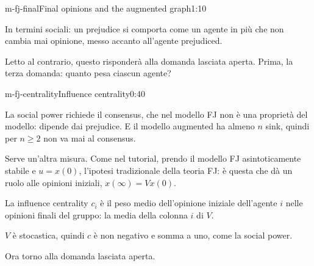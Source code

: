 \begin{slide}{m-fj-final}{Final opinions and the augmented graph}{1:10 {\color{red}}}
\begin{discorso}
    \item In termini sociali: un prejudice si comporta come un agente in più che non cambia mai opinione, messo accanto all'agente prejudiced.
    \item {\color{red} } {\color{blue}Letto} al contrario, {\color{red}} {\color{blue}questo risponderà} alla domanda lasciata aperta. {\color{blue}Prima, la terza domanda: quanto pesa ciascun agente?}
  \end{discorso}
\end{slide}

\begin{slide}{m-fj-centrality}{Influence centrality}{0:40}
  \begin{discorso}
    \item La social power richiede il consensus, che nel modello FJ non è una proprietà del modello: dipende dai prejudice. E il modello augmented ha almeno $n$ sink, quindi per $n\ge2$ non va mai al consensus.
    \item Serve un'altra misura. Come nel tutorial, prendo il modello FJ asintoticamente stabile e $u=x(0)$, l'ipotesi tradizionale della teoria FJ: è questa che dà un ruolo alle opinioni iniziali, $x(\infty)=Vx(0)$.
    \item La influence centrality $c_i$ è il peso medio dell'opinione iniziale dell'agente $i$ nelle opinioni finali del gruppo: la media della colonna $i$ di $V$.
    \item $V$ è stocastica, quindi $c$ è non negativo e somma a uno, come la social power.
    \item {\color{blue}Ora torno alla domanda lasciata aperta.}
    \item {\color{red}        }
  \end{discorso}
\end{slide}

